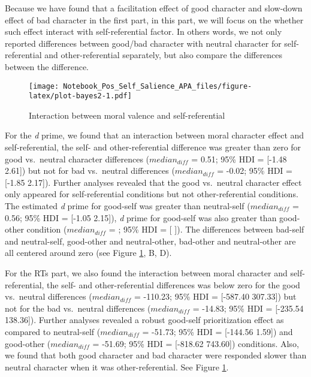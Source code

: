 \documentclass[
  english,
  man]{apa6}
\begin{document}
Because we have found that a facilitation effect of good character and slow-down effect of bad character in the first part, in this part, we will focus on the whether such effect interact with self-referential factor. In others words, we not only reported differences between good/bad character with neutral character for self-referential and other-referential separately, but also compare the differences between the difference.

\begin{figure}
\centering
\texttt{[image: Notebook\_Pos\_Self\_Salience\_APA\_files/figure-latex/plot-bayes2-1.pdf]}
\caption{\label{fig:plot-bayes2}Interaction between moral valence and self-referential}
\end{figure}

For the \emph{d} prime, we found that an interaction between moral character effect and self-referential, the self- and other-referential difference was greater than zero for good vs.~neutral character differences (\(median_{diff}\) = 0.51; 95\% HDI = {[}-1.48 2.61{]}) but not for bad vs.~neutral differences (\(median_{diff}\) = -0.02; 95\% HDI = {[}-1.85 2.17{]}). Further analyses revealed that the good vs.~neutral character effect only appeared for self-referential conditions but not other-referential conditions. The estimated \emph{d} prime for good-self was greater than neutral-self (\(median_{diff}\) = 0.56; 95\% HDI = {[}-1.05 2.15{]}), \emph{d} prime for good-self was also greater than good-other condition (\(median_{diff}\) = ; 95\% HDI = {[} {]}). The differences between bad-self and neutral-self, good-other and neutral-other, bad-other and neutral-other are all centered around zero (see Figure \ref{fig:plot-bayes2}, B, D).

For the RTs part, we also found the interaction between moral character and self-referential, the self- and other-referential differences was below zero for the good vs.~neutral differences (\(median_{diff}\) = -110.23; 95\% HDI = {[}-587.40 307.33{]}) but not for the bad vs.~neutral differences (\(median_{diff}\) = -14.83; 95\% HDI = {[}-235.54 138.36{]}). Further analyses revealed a robust good-self prioritization effect as compared to neutral-self (\(median_{diff}\) = -51.73; 95\% HDI = {[}-144.56 1.59{]}) and good-other (\(median_{diff}\) = -51.69; 95\% HDI = {[}-818.62 743.60{]}) conditions. Also, we found that both good character and bad character were responded slower than neutral character when it was other-referential. See Figure \ref{fig:plot-bayes2}.
\end{document}
